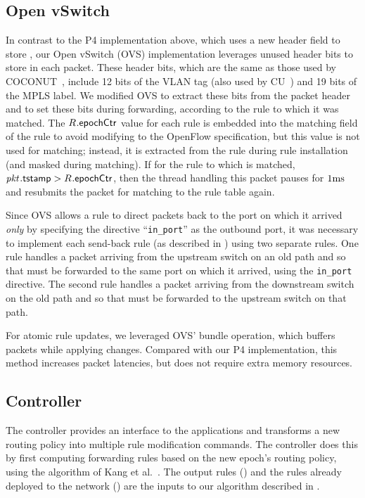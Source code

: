 \subsection{Open vSwitch}
\label{sec:impl:openvswitch}

In contrast to the P4 implementation above, which uses a new header
field to store \pktID{}{\tagTmpField}, our Open vSwitch (OVS)
implementation leverages unused header bits to store
\pktID{}{\tagTmpField} in each packet.  These header bits, which are
the same as those used by COCONUT~\cite{COCONUT}, include 12 bits of
the VLAN tag (also used by CU~\cite{CU}) and 19 bits of the MPLS
label.  We modified OVS to extract these bits from the packet
header and to set these bits during forwarding, according to the rule
to which it was matched.  The $\ruleID{}{\epochField}$ value for each
rule  is embedded into the matching field of the rule to
avoid modifying to the OpenFlow specification, but this value is not
used for matching; instead, it is extracted from the rule during rule
installation (and masked during matching).  If for the rule 
to which \pktID{} is matched, $\pktID{}{\tagTmpField} >
\ruleID{}{\epochField}$, then the thread handling this packet pauses
for $1\mathrm{ms}$ and resubmits the packet for matching to the rule table
again.

Since OVS allows a rule to direct packets back to the port on
which it arrived \textit{only} by specifying the directive
``\texttt{in\_port}'' as the outbound port, it was necessary to
implement each send-back rule (as described in )
using two separate rules.  One rule handles a packet arriving from the
upstream switch on an old path and so that must be forwarded to the
same port on which it arrived, using the \texttt{in\_port} directive.
The second rule handles a packet arriving from the downstream switch on
the old path and so that must be forwarded to the upstream switch on
that path.

For atomic rule updates, we leveraged OVS' bundle operation, which
buffers packets while applying changes. Compared with our P4
implementation, this method increases packet latencies, but does not
require extra memory resources.

\subsection{Controller}

The controller provides an interface to the applications and
transforms a new routing policy into multiple rule modification
commands.  The controller does this by first computing forwarding
rules based on the new epoch's routing policy, using the algorithm of
Kang et al.~\cite{OneBigSwitch}.  The output rules (\newRules) and the
rules already deployed to the network (\oldRules) are the inputs to
our algorithm described in .

